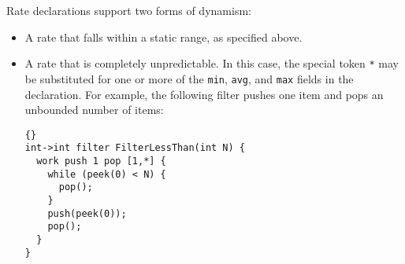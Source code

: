 \documentclass[11pt]{article}
\begin{document}
\noindent Rate declarations support two forms of dynamism:
\begin{itemize}

\item A rate that falls within a static range, as specified above.





\item A rate that is completely unpredictable.  In this case, the
special token \lstinline|*| may be substituted for one or more of the
\lstinline|min|, \lstinline|avg|, and \lstinline|max| fields in the
declaration.  For example, the following filter pushes one item and
pops an unbounded number of items:

\begin{lstlisting}{}
int->int filter FilterLessThan(int N) {
  work push 1 pop [1,*] {
    while (peek(0) < N) {
      pop();
    }
    push(peek(0));
    pop();
  }
}
\end{lstlisting}


\end{itemize}
\end{document}
